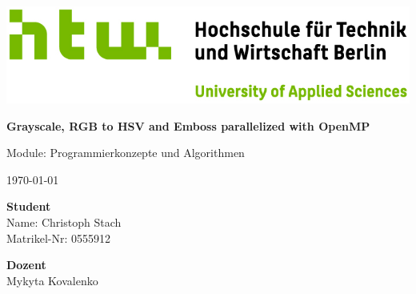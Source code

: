


    \begin{titlepage}
        \noindent
        \includegraphics[width=1.0\textwidth]{images/Q04_HTW_Berlin_Logo_quer_pos_FARBIG_RGB.jpg}


        \vspace{2cm}

        \begin{center}
            \noindent
            \huge{\textbf{Grayscale, RGB to HSV and Emboss parallelized with OpenMP}}

            \vspace{1cm}

            \noindent
            \LARGE{Module: Programmierkonzepte und Algorithmen}

            \vspace{1cm}

            \noindent
            \small{\today}
        \end{center}

        \vfill

        \noindent
        \begin{minipage}[t]{0.5\textwidth}
            \begin{flushleft}
                \textbf{Student}\\
                Name: Christoph Stach\\
                Matrikel-Nr: 0555912                
            \end{flushleft}
        \end{minipage}
        \begin{minipage}[t]{0.5\textwidth}
            \begin{flushright}
                \textbf{Dozent}\\
                Mykyta Kovalenko\\
            \end{flushright}
        \end{minipage}
    \end{titlepage}

    \tableofcontents

    
    

    \begin{spacing}{1.0}
        \listoffigures        
    \end{spacing} 

    \begin{spacing}{1.0}
        \lstlistoflistings        
    \end{spacing}
